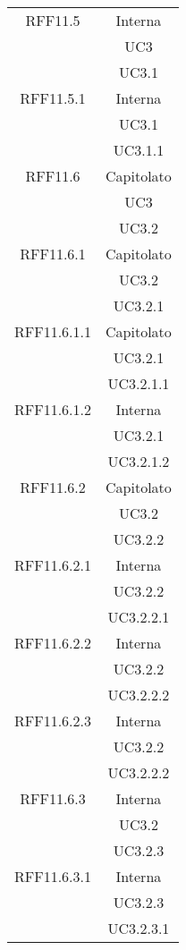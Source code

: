 \begin{longtable}{|c|c|}
\midrule
RFF11.5
& Interna\\
& UC3\\
& UC3.1\\

\midrule
RFF11.5.1
& Interna\\
& UC3.1\\
& UC3.1.1\\

\midrule
RFF11.6
& Capitolato\\
& UC3\\
& UC3.2\\

\midrule
RFF11.6.1
& Capitolato\\
& UC3.2\\
& UC3.2.1\\

\midrule
RFF11.6.1.1
& Capitolato\\
& UC3.2.1\\
& UC3.2.1.1\\

\midrule
RFF11.6.1.2
& Interna\\
& UC3.2.1\\
& UC3.2.1.2\\

\midrule
RFF11.6.2
& Capitolato\\
& UC3.2\\
& UC3.2.2\\

\midrule
RFF11.6.2.1
& Interna\\
& UC3.2.2\\
& UC3.2.2.1\\

\midrule
RFF11.6.2.2
& Interna\\
& UC3.2.2\\
& UC3.2.2.2\\

\midrule
RFF11.6.2.3
& Interna\\
& UC3.2.2\\
& UC3.2.2.2\\

\midrule
RFF11.6.3
& Interna\\
& UC3.2\\
& UC3.2.3\\

\midrule
RFF11.6.3.1
& Interna\\
& UC3.2.3\\
& UC3.2.3.1\\


\end{longtable}
